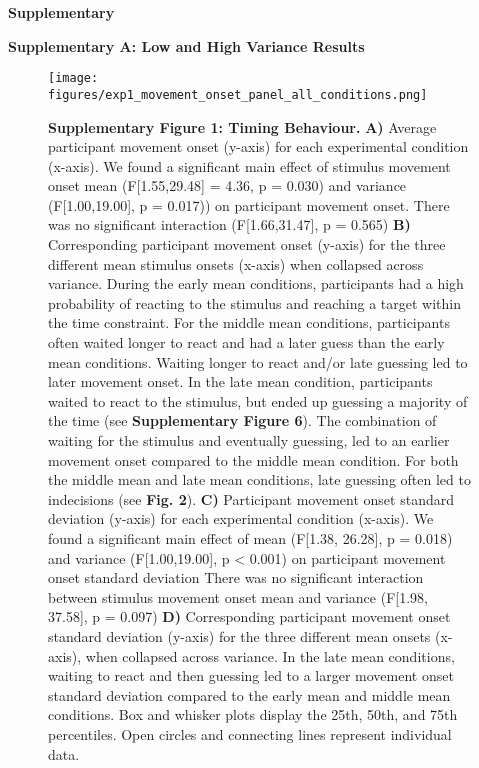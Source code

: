 \documentclass[12pt]{article}
\newcommand\boldblue[1]{\textcolor{mydarkblue}{\textbf{#1}}}
\newcommand{\SectionHeader}[1]{\noindent\textbf{\Large\textcolor{mydarkblue}{#1}}\normalsize }
\begin{document}
\SectionHeader{Supplementary}

\noindent\boldblue{\large{Supplementary A: Low and High Variance Results}}
\begin{figure}[H]
    \centering
    \texttt{[image: figures/exp1\_movement\_onset\_panel\_all\_conditions.png]}
    \caption*{\boldblue{Supplementary Figure 1: Timing Behaviour.} \boldblue{A)} Average participant movement onset (y-axis) for each experimental condition (x-axis). We found a significant main effect of stimulus movement onset mean (F[1.55,29.48] = 4.36, p = 0.030) and variance (F[1.00,19.00], p = 0.017)) on participant movement onset. There was no significant interaction (F[1.66,31.47], p = 0.565) \boldblue{B)} Corresponding participant movement onset (y-axis) for the three different mean stimulus onsets (x-axis) when collapsed across variance. During the early mean conditions, participants had a high probability of reacting to the stimulus and reaching a target within the time constraint. For the middle mean conditions, participants often waited longer to react and had a later guess than the early mean conditions. Waiting longer to react and/or late guessing led to later movement onset. In the late mean condition, participants waited to react to the stimulus, but ended up guessing a majority of the time (see \boldblue{Supplementary Figure 6}). The combination of waiting for the stimulus and eventually guessing, led to an earlier movement onset compared to the middle mean condition. For both the middle mean and late mean conditions, late guessing often led to indecisions (see \boldblue{Fig. 2}). \boldblue{C)} Participant movement onset standard deviation (y-axis) for each experimental condition (x-axis). We found a significant main effect of mean (F[1.38, 26.28], p = 0.018) and variance (F[1.00,19.00], p < 0.001) on participant movement onset standard deviation There was no significant interaction between stimulus movement onset mean and variance (F[1.98, 37.58], p = 0.097) \boldblue{D)} Corresponding participant movement onset standard deviation (y-axis) for the three different mean onsets (x-axis), when collapsed across variance. In the late mean conditions, waiting to react and then guessing led to a larger movement onset standard deviation compared to the early mean and middle mean conditions. Box and whisker plots display the 25th, 50th, and 75th percentiles. Open circles and connecting lines represent individual data.}
\end{figure}
\end{document}
